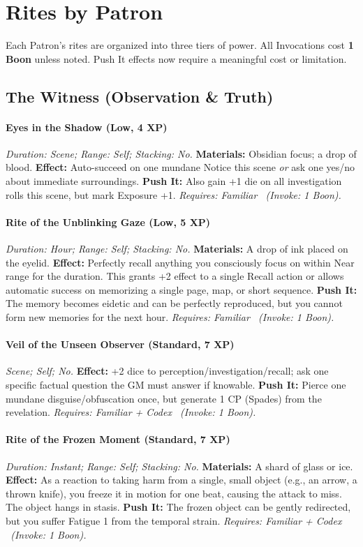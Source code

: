 \section{Rites by Patron}
Each Patron's rites are organized into three tiers of power. All Invocations cost \textbf{1 Boon} unless noted. Push It effects now require a meaningful cost or limitation.

\subsection{The Witness (Observation \& Truth)}
\paragraph{Eyes in the Shadow (Low, 4 XP)} \emph{Duration: Scene; Range: Self; Stacking: No.}
\textbf{Materials:} Obsidian focus; a drop of blood.
\textbf{Effect:} Auto-succeed on one mundane Notice this scene \emph{or} ask one yes/no about immediate surroundings.
\textbf{Push It:} Also gain +1 die on all investigation rolls this scene, but mark Exposure +1.
\emph{Requires: Familiar \ (\textit{Invoke:} 1 Boon).}
\paragraph{Rite of the Unblinking Gaze (Low, 5 XP)} \emph{Duration: Hour; Range: Self; Stacking: No.}
\textbf{Materials:} A drop of ink placed on the eyelid.
\textbf{Effect:} Perfectly recall anything you consciously focus on within Near range for the duration. This grants +2 effect to a single Recall action or allows automatic success on memorizing a single page, map, or short sequence.
\textbf{Push It:} The memory becomes eidetic and can be perfectly reproduced, but you cannot form new memories for the next hour.
\emph{Requires: Familiar \ (\textit{Invoke:} 1 Boon).}
\paragraph{Veil of the Unseen Observer (Standard, 7 XP)} \emph{Scene; Self; No.}
\textbf{Effect:} +2 dice to perception/investigation/recall; ask one specific factual question the GM must answer if knowable.
\textbf{Push It:} Pierce one mundane disguise/obfuscation once, but generate 1 CP (Spades) from the revelation.
\emph{Requires: Familiar + Codex \ (\textit{Invoke:} 1 Boon).}
\paragraph{Rite of the Frozen Moment (Standard, 7 XP)} \emph{Duration: Instant; Range: Self; Stacking: No.}
\textbf{Materials:} A shard of glass or ice.
\textbf{Effect:} As a reaction to taking harm from a single, small object (e.g., an arrow, a thrown knife), you freeze it in motion for one beat, causing the attack to miss. The object hangs in stasis.
\textbf{Push It:} The frozen object can be gently redirected, but you suffer Fatigue 1 from the temporal strain.
\emph{Requires: Familiar + Codex \ (\textit{Invoke:} 1 Boon).}
